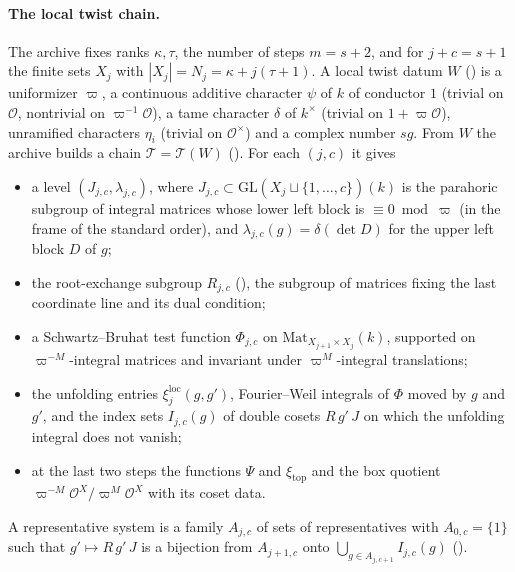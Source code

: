 \documentclass[11pt]{article}
\newcommand{\Ok}{\mathcal O}
\newcommand{\GL}{\mathrm{GL}}
\newcommand{\Mat}{\mathrm{Mat}}
\theoremstyle{definition}
\theoremstyle{remark}
\begin{document}
\paragraph{The local twist chain.} The archive fixes ranks $\kappa,\tau$, the number of steps $m=s+2$, and for $j+c=s+1$ the finite sets $X_j$ with $|X_j|=N_j=\kappa+j(\tau+1)$. A local twist datum $W$ () is a uniformizer $\varpi$, a continuous additive character $\psi$ of $k$ of conductor $1$ (trivial on $\Ok$, nontrivial on $\varpi^{-1}\Ok$), a tame character $\delta$ of $k^\times$ (trivial on $1+\varpi\Ok$), unramified characters $\eta_i$ (trivial on $\Ok^\times$) and a complex number $sg$. From $W$ the archive builds a chain $\mathcal T=\mathcal T(W)$ (). For each $(j,c)$ it gives
\begin{itemize}[leftmargin=*,itemsep=1pt]
\item a level $(J_{j,c},\lambda_{j,c})$, where $J_{j,c}\subset\GL(X_j\sqcup\{1,\dots,c\})(k)$ is the parahoric subgroup of integral matrices whose lower left block is $\equiv0\bmod\varpi$ (in the frame of the standard order), and $\lambda_{j,c}(g)=\delta(\det D)$ for the upper left block $D$ of $g$;
\item the root-exchange subgroup $R_{j,c}$ (), the subgroup of matrices fixing the last coordinate line and its dual condition;
\item a Schwartz--Bruhat test function $\Phi_{j,c}$ on $\Mat_{X_{j+1}\times X_j}(k)$, supported on $\varpi^{-M}$-integral matrices and invariant under $\varpi^{M}$-integral translations;
\item the unfolding entries $\xi^{\mathrm{loc}}_j(g,g')$, Fourier--Weil integrals of $\Phi$ moved by $g$ and $g'$, and the index sets $I_{j,c}(g)$ of double cosets $R\,g'\,J$ on which the unfolding integral  does not vanish;
\item at the last two steps the functions $\Psi$ and $\xi_{\mathrm{top}}$ and the box quotient $\varpi^{-M}\Ok^{X}/\varpi^{M}\Ok^{X}$ with its coset data.
\end{itemize}
A representative system is a family $A_{j,c}$ of sets of representatives with $A_{0,c}=\{1\}$ such that $g'\mapsto R\,g'\,J$ is a bijection from $A_{j+1,c}$ onto $\bigcup_{g\in A_{j,c+1}}I_{j,c}(g)$ ().
\end{document}
